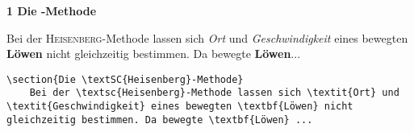 \begin{frame}[fragile]
	\Losung
	\begin{outputbox}
		{ \LARGE\textbf{1 Die -Methode}}
		
		Bei der \textsc{Heisenberg}-Methode lassen sich \textit{Ort} und \textit{Geschwindigkeit} eines bewegten \textbf{Löwen} nicht gleichzeitig bestimmen. Da bewegte \textbf{Löwen}...
	\end{outputbox}

	\Code
	\begin{lstlisting}
\section{Die \textSC{Heisenberg}-Methode}	
	Bei der \textsc{Heisenberg}-Methode lassen sich \textit{Ort} und \textit{Geschwindigkeit} eines bewegten \textbf{Löwen} nicht gleichzeitig bestimmen. Da bewegte \textbf{Löwen} ...
	\end{lstlisting}
\end{frame}
